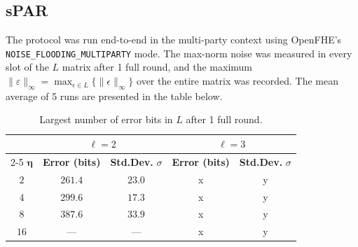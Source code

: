 


\subsection{sPAR}
The protocol was run end-to-end in the multi-party context using OpenFHE's \texttt{NOISE\_FLOODING\_MULTIPARTY} mode. The max-norm noise was measured in every slot of the $L$ matrix after 1 full round, and the maximum $\|\varepsilon\|_\infty = \max_{\epsilon\in L}\{\|\epsilon\|_\infty\}$ over the entire matrix was recorded. The mean average of 5 runs are presented in the table below.


\vspace{4pt}
\begin{table}[H]
    \caption{Largest number of error bits in $L$ after 1 full round.}
    \label{tab:noise:multiparty}
    \centering
    \begin{tabular}{ccc|cc}
        \toprule
        & \multicolumn{2}{c}{$\ell = 2$}
        & \multicolumn{2}{c}{$\ell = 3$} \\
        \cmidrule(lr){2-5}
        $\mathbf{\eta}$ & \textbf{Error (bits)} & \textbf{Std.Dev.} $\sigma$ & \textbf{Error (bits)} & \textbf{Std.Dev.} $\sigma$ \\
        \midrule
        $2$  & $261.4$ & $23.0$ & x & y \\ %
        $4$  & $299.6$ & $17.3$ & x & y \\ %
        $8$  & $387.6$ & $33.9$ & x & y \\ %
        $16$ &   ---   &   ---  & x & y \\ %
        \bottomrule
    \end{tabular}
\end{table}


